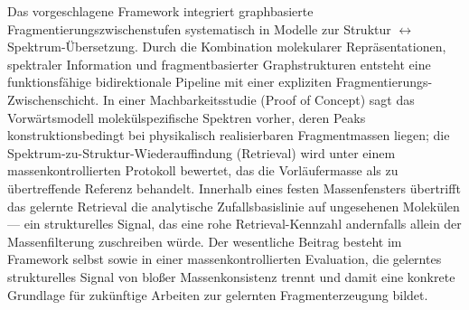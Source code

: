 Das vorgeschlagene Framework integriert graphbasierte Fragmentierungszwischenstufen systematisch in Modelle zur Struktur $\leftrightarrow$ Spektrum-Übersetzung.
Durch die Kombination molekularer Repräsentationen, spektraler Information und fragmentbasierter Graphstrukturen entsteht eine funktionsfähige bidirektionale Pipeline mit einer expliziten Fragmentierungs-Zwischenschicht.
In einer Machbarkeitsstudie (Proof of Concept) sagt das Vorwärtsmodell molekülspezifische Spektren vorher, deren Peaks konstruktionsbedingt bei physikalisch realisierbaren Fragmentmassen liegen; die Spektrum-zu-Struktur-Wiederauffindung (Retrieval) wird unter einem massenkontrollierten Protokoll bewertet, das die Vorläufermasse als zu übertreffende Referenz behandelt. Innerhalb eines festen Massenfensters übertrifft das gelernte Retrieval die analytische Zufallsbasislinie auf ungesehenen Molekülen --- ein strukturelles Signal, das eine rohe Retrieval-Kennzahl andernfalls allein der Massenfilterung zuschreiben würde.
Der wesentliche Beitrag besteht im Framework selbst sowie in einer massenkontrollierten Evaluation, die gelerntes strukturelles Signal von bloßer Massenkonsistenz trennt und damit eine konkrete Grundlage für zukünftige Arbeiten zur gelernten Fragmenterzeugung bildet.

{}
\listoftables
{}
{}
\listoffigures
{}
{}
